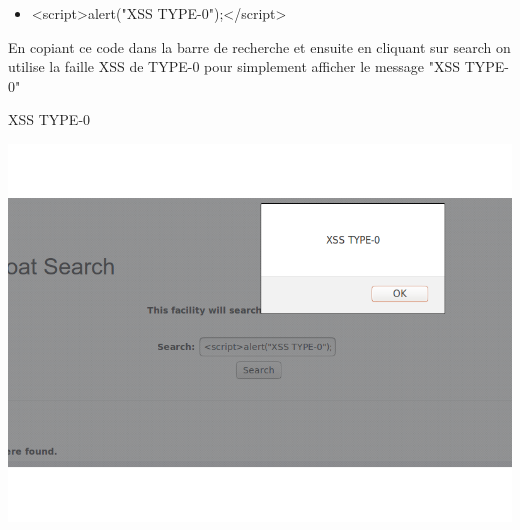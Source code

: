 \bigskip

\begin{itemize}
\item <script>alert("XSS TYPE-0");</script>
\end{itemize}

\bigskip

\begin{flushleft}
En copiant ce code dans la barre de recherche et ensuite en cliquant sur search on utilise la faille XSS de TYPE-0 pour simplement afficher le message "XSS TYPE-0"
\end{flushleft}

\begin{center}
\caption{XSS TYPE-0}
\includegraphics[scale=0.3]{Web/assets/XSS0.png}
\end{center}

